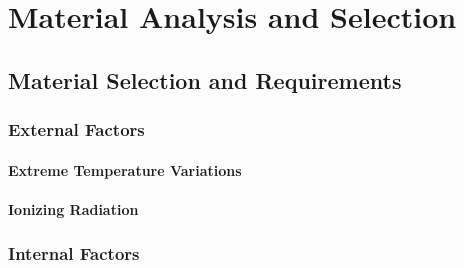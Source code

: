 \section{Material Analysis and Selection}


\subsection{Material Selection and Requirements}

\subsubsection{External Factors}

\paragraph{Extreme Temperature Variations}

\paragraph{Ionizing Radiation}


\subsubsection{Internal Factors}
